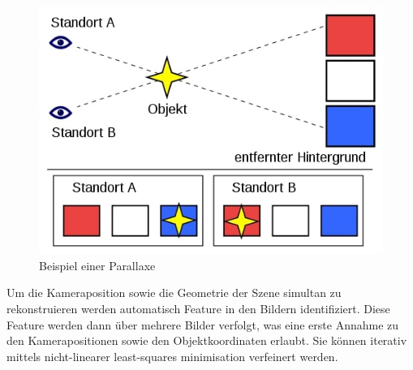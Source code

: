 \begin{figure}
    \centering
    \includegraphics[width=\textwidth]{src/img/500px-Parallax_Example_de.jpg}
    \caption{Beispiel einer Parallaxe~\cite{wiki:parallax_example_de}}
    \label{fig:theory-sfm-parallax}
\end{figure}

Um die Kameraposition sowie die Geometrie der Szene simultan zu rekonstruieren werden automatisch Feature in den Bildern identifiziert.
Diese Feature werden dann über mehrere Bilder verfolgt, was eine erste Annahme zu den Kamerapositionen sowie den Objektkoordinaten erlaubt.
Sie können iterativ mittels nicht-linearer least-squares minimisation verfeinert werden. ~\cite[Kapitel 1.3]{westoby_2012}

